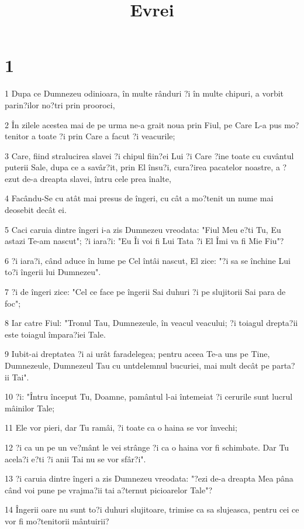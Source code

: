 

\title{Evrei}


\chapter{1}

\par 1 Dupa ce Dumnezeu odinioara, în multe rânduri ?i în multe chipuri, a vorbit parin?ilor no?tri prin prooroci,
\par 2 În zilele acestea mai de pe urma ne-a grait noua prin Fiul, pe Care L-a pus mo?tenitor a toate ?i prin Care a facut ?i veacurile;
\par 3 Care, fiind stralucirea slavei ?i chipul fiin?ei Lui ?i Care ?ine toate cu cuvântul puterii Sale, dupa ce a savâr?it, prin El însu?i, cura?irea pacatelor noastre, a ?ezut de-a dreapta slavei, întru cele prea înalte,
\par 4 Facându-Se cu atât mai presus de îngeri, cu cât a mo?tenit un nume mai deosebit decât ei.
\par 5 Caci caruia dintre îngeri i-a zis Dumnezeu vreodata: "Fiul Meu e?ti Tu, Eu astazi Te-am nascut"; ?i iara?i: "Eu Îi voi fi Lui Tata ?i El Îmi va fi Mie Fiu"?
\par 6 ?i iara?i, când aduce în lume pe Cel întâi nascut, El zice: "?i sa se închine Lui to?i îngerii lui Dumnezeu".
\par 7 ?i de îngeri zice: "Cel ce face pe îngerii Sai duhuri ?i pe slujitorii Sai para de foc";
\par 8 Iar catre Fiul: "Tronul Tau, Dumnezeule, în veacul veacului; ?i toiagul drepta?ii este toiagul împara?iei Tale.
\par 9 Iubit-ai dreptatea ?i ai urât faradelegea; pentru aceea Te-a uns pe Tine, Dumnezeule, Dumnezeul Tau cu untdelemnul bucuriei, mai mult decât pe parta?ii Tai".
\par 10 ?i: "Întru început Tu, Doamne, pamântul l-ai întemeiat ?i cerurile sunt lucrul mâinilor Tale;
\par 11 Ele vor pieri, dar Tu ramâi, ?i toate ca o haina se vor învechi;
\par 12 ?i ca un pe un ve?mânt le vei strânge ?i ca o haina vor fi schimbate. Dar Tu acela?i e?ti ?i anii Tai nu se vor sfâr?i".
\par 13 ?i caruia dintre îngeri a zis Dumnezeu vreodata: "?ezi de-a dreapta Mea pâna când voi pune pe vrajma?ii tai a?ternut picioarelor Tale"?
\par 14 Îngerii oare nu sunt to?i duhuri slujitoare, trimise ca sa slujeasca, pentru cei ce vor fi mo?tenitorii mântuirii?

